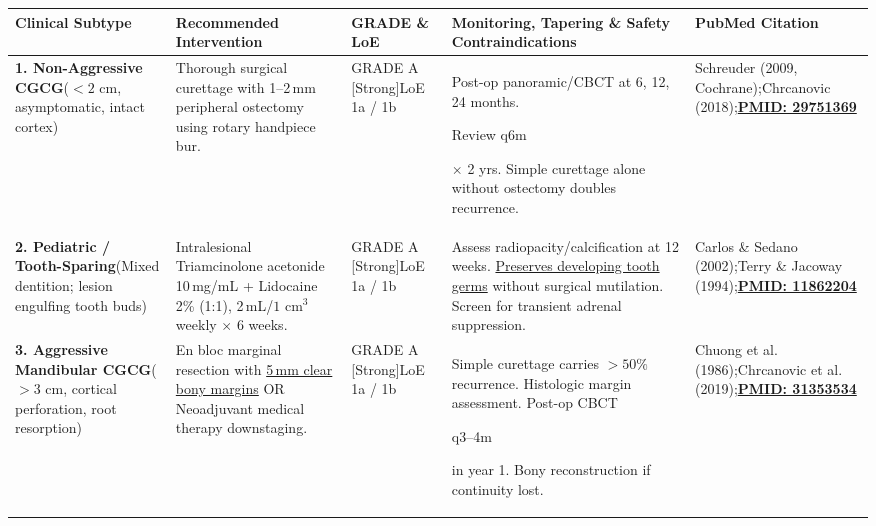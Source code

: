 \documentclass[9pt,a4paper]{article}
\newcommand{\hlg}[1]{\colorbox{hlgray}{\strut #1}}
\begin{document}
\footnotesize
\setlength{\tabcolsep}{3.5pt}
\renewcommand{\arraystretch}{1.10}
\begin{tabularx}{\linewidth}{>{\raggedright\arraybackslash}p{2.8cm} >{\raggedright\arraybackslash}p{3.8cm} >{\raggedright\arraybackslash}p{2.0cm} >{\raggedright\arraybackslash}p{5.1cm} >{\raggedright\arraybackslash}X}
\toprule
\textbf{Clinical Subtype} & \textbf{Recommended Intervention} & \textbf{GRADE \& LoE} & \textbf{Monitoring, Tapering \& Safety Contraindications} & \textbf{PubMed Citation} \\
\midrule
\textbf{1. Non-Aggressive CGCG}\newline\scriptsize ($<2\text{ cm}$, asymptomatic, intact cortex) &
Thorough surgical curettage with 1--2\,mm peripheral ostectomy using rotary handpiece bur. &
GRADE A [Strong]\newline LoE 1a / 1b &
Post-op panoramic/CBCT at 6, 12, 24 months. \hlg{Review q6m} $\times$ 2 yrs. Simple curettage alone without ostectomy doubles recurrence. &
Schreuder (2009, Cochrane);\newline Chrcanovic (2018);\newline \href{https://pubmed.ncbi.nlm.nih.gov/29751369/}{\textbf{PMID: 29751369}} \\
\midrule
\textbf{2. Pediatric / Tooth-Sparing}\newline\scriptsize (Mixed dentition; lesion engulfing tooth buds) &
Intralesional Triamcinolone acetonide 10\,mg/mL + Lidocaine 2\% (1:1), 2\,mL/$1\text{ cm}^3$ weekly $\times$ 6 weeks. &
GRADE A [Strong]\newline LoE 1a / 1b &
Assess radiopacity/calcification at 12 weeks. \underline{Preserves developing tooth germs} without surgical mutilation. Screen for transient adrenal suppression. &
Carlos \& Sedano (2002);\newline Terry \& Jacoway (1994);\newline \href{https://pubmed.ncbi.nlm.nih.gov/11862204/}{\textbf{PMID: 11862204}} \\
\midrule
\textbf{3. Aggressive Mandibular CGCG}\newline\scriptsize ($>3\text{ cm}$, cortical perforation, root resorption) &
En bloc marginal resection with \underline{5\,mm clear bony margins} OR Neoadjuvant medical therapy downstaging. &
GRADE A [Strong]\newline LoE 1a / 1b &
Simple curettage carries $>50\%$ recurrence. Histologic margin assessment. Post-op CBCT \hlg{q3--4m} in year 1. Bony reconstruction if continuity lost. &
Chuong et al. (1986);\newline Chrcanovic et al. (2019);\newline \href{https://pubmed.ncbi.nlm.nih.gov/31353534/}{\textbf{PMID: 31353534}} \\

\end{tabularx}
\end{document}
